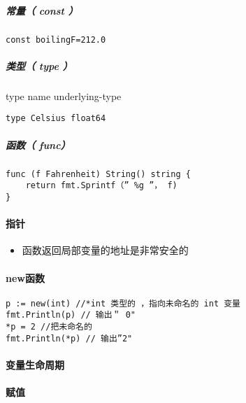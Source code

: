 \hypertarget{ux5e38ux91cf-const}{%
\subparagraph{常量（ const ）}\label{ux5e38ux91cf-const}}

\begin{verbatim}
const boilingF=212.0
\end{verbatim}

\hypertarget{ux7c7bux578b-type}{%
\subparagraph{类型（ type ）}\label{ux7c7bux578b-type}}

type name underlying-type

\begin{verbatim}
type Celsius float64
\end{verbatim}

\hypertarget{ux51fdux6570-func}{%
\subparagraph{函数（ func）}\label{ux51fdux6570-func}}

\begin{verbatim}
func (f Fahrenheit) String() string { 
    return fmt.Sprintf（” %g ”， f) 
}
\end{verbatim}

\hypertarget{ux6307ux9488}{%
\paragraph{指针}\label{ux6307ux9488}}

\begin{itemize}
\tightlist
\item
  函数返回局部变量的地址是非常安全的
\end{itemize}

\hypertarget{newux51fdux6570}{%
\paragraph{new函数}\label{newux51fdux6570}}

\begin{verbatim}
p := new(int) //*int 类型的 ，指向未命名的 int 变量
fmt.Println(p) // 输出＂ 0"
*p = 2 //把未命名的 
fmt.Println(*p) // 输出”2"
\end{verbatim}

\hypertarget{ux53d8ux91cfux751fux547dux5468ux671f}{%
\paragraph{变量生命周期}\label{ux53d8ux91cfux751fux547dux5468ux671f}}

\hypertarget{ux8d4bux503c}{%
\paragraph{赋值}\label{ux8d4bux503c}}

